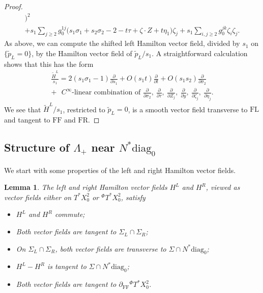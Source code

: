 \documentclass[10pt, a4paper, twoside]{amsart}
\numberwithin{equation}{section}
\newtheorem{lemma}[theorem]{Lemma}
\theoremstyle{remark}
\begin{document}
\begin{proof}
\begin{equation}
\begin{gathered}
\big)^2 \\ + s_1 \sum_{j \geq 2} g_0^{1j} \big(s_1 \sigma_1  + s_2 \sigma_2 -2 - t \tau +  \zeta \cdot Z +  t \eta_1 \big)  \zeta_j + s_1 \sum_{i, j \geq 2} g_0^{jk} \zeta_i \zeta_j.
\end{gathered}\label{shifted-Ham-r55} \end{equation}
As above, we can compute the shifted left Hamilton vector field, divided by $s_1$ on $\{ {\tilde p_L} = 0 \}$, by the Hamilton vector field of ${\tilde p_L}/s_1$. A straightforward calculation shows that this has the form
\begin{equation}\begin{gathered}
\frac{\tilde H^L}{s_1} = 2(s_1 \sigma_1 -1)\frac{\partial}{\partial s_1}
+ O(s_1 t) \frac{\partial}{\partial t} + O(s_1 s_2) \frac{\partial}{\partial \sigma_2} \\
+ \text{ $C^\infty$-linear combination of }
\frac{\partial}{\partial \sigma_2}, \
 \frac{\partial}{\partial \tau}, \  \frac{\partial}{\partial Z_j}, \
 \frac{\partial}{\partial y},  \  \frac{\partial}{\partial \zeta_j} , \ \frac{\partial}{\partial \eta_j}.
\end{gathered}\end{equation}
 We see that ${\tilde H^L}/s_1$, restricted to ${\tilde p_L} = 0$, is a smooth vector field transverse to ${\mathrm{FL}}$ and tangent to ${\mathrm{FF}}$ and ${\mathrm{FR}}$.

\end{proof}

\subsection{Structure of $\Lambda_+$ near $N^* {\mathrm{diag}_0}$} 
We start with some properties of the left and right Hamilton vector fields.

\begin{lemma}\label{lem:commute} The left and right Hamilton  vector fields $H^L$ and $H^R$, viewed as vector fields either on $T^* X^2_0$ or ${}^\Phi T^* X^2_0$,  satisfy
\begin{itemize}
\item[(i)] $H^L$ and $H^R$ commute; 
\item[(ii)] Both vector fields are tangent to $\Sigma_L \cap \Sigma_R$;
\item[(iii)] On $\Sigma_L \cap \Sigma_R$,  both vector fields are transverse to $\Sigma \cap N^* {\mathrm{diag}_0}$;
\item[(iv)] $H^L - H^R$ is tangent to $\Sigma \cap N^* {\mathrm{diag}_0}$;
\item[(v)] Both vector fields are tangent to $\partial_{\mathrm{FF}} {}^\Phi T^* X^2_0$.
\end{itemize}
\end{lemma}
\end{document}
